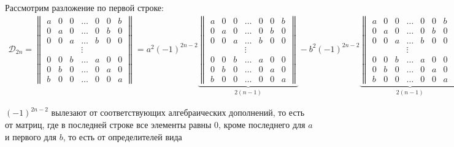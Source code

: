 \begin{solution}
    Рассмотрим разложение по первой строке:
    \begin{gather}
        \mathcal{D}_{2n} = 
        \begin{Vmatrix}
            a & 0 & 0 & \ldots & 0 & 0 & b \\
            0 & a & 0 & \ldots & 0 & b & 0 \\
            0 & 0 & a & \ldots & b & 0 & 0 \\
              &   &   & \vdots &   &   &   \\
            0 & 0 & b & \ldots & a & 0 & 0 \\
            0 & b & 0 & \ldots & 0 & a & 0 \\
            b & 0 & 0 & \ldots & 0 & 0 & a
        \end{Vmatrix} = a^2(-1)^{2n-2}
        \underbrace{
        \begin{Vmatrix}
            a & 0 & 0 & \ldots & 0 & 0 & b \\
            0 & a & 0 & \ldots & 0 & b & 0 \\
            0 & 0 & a & \ldots & b & 0 & 0 \\
              &   &   & \vdots &   &   &   \\
            0 & 0 & b & \ldots & a & 0 & 0 \\
            0 & b & 0 & \ldots & 0 & a & 0 \\
            b & 0 & 0 & \ldots & 0 & 0 & a
        \end{Vmatrix}}_{2(n-1)} - b^2(-1)^{2n-2}
        \underbrace{
        \begin{Vmatrix}
            a & 0 & 0 & \ldots & 0 & 0 & b \\
            0 & a & 0 & \ldots & 0 & b & 0 \\
            0 & 0 & a & \ldots & b & 0 & 0 \\
              &   &   & \vdots &   &   &   \\
            0 & 0 & b & \ldots & a & 0 & 0 \\
            0 & b & 0 & \ldots & 0 & a & 0 \\
            b & 0 & 0 & \ldots & 0 & 0 & a
        \end{Vmatrix}}_{2(n-1)}
    \end{gather}
    \begin{remark}
        $(-1)^{2n-2}$ вылезают от соответствующих алгебраических дополнений, то есть от матриц, где в последней строке все элементы равны 0, кроме последнего для $a$ и первого для $b$, то есть от определителей вида

\end{remark}
\end{solution}
